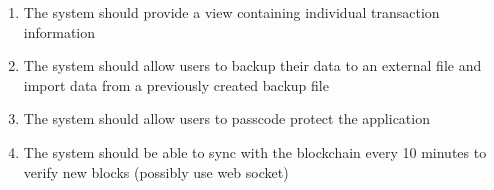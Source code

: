 \begin{adjustwidth}{1.5em}{0pt}
\begin{enumerate}[label=3.\arabic*]
		\item The system should provide a view containing individual transaction information
		
		\item The system should allow users to backup their data to an external file and import data from a previously created backup file
		
		\item The system should allow users to passcode protect the application

    \item The system should be able to sync with the blockchain every 10 minutes to verify new blocks (possibly use web socket)
		
\end{enumerate}


	
\end{adjustwidth}
